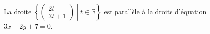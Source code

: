 La droite  $\left\{\begin{pmatrix}2t\\3t+1\end{pmatrix}\middle| t\in\mathbb{R}\right\}$ est parallèle à la droite d'équation $3x-2y+7=0$.

\begin{reponses}
\end{reponses}

